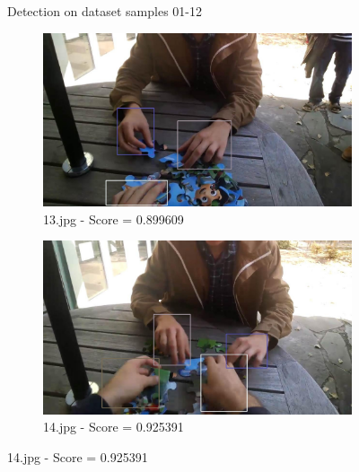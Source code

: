 \begin{figure}[!h]
\begin{subfigure}[b]{0.3\textwidth}
    \end{subfigure}
    \caption{Detection on dataset samples 01-12}
       
\end{figure}



\begin{figure}[!h]
    \centering
    \begin{subfigure}[b]{0.3 \textwidth}
        \centering
        \includegraphics[width=\textwidth]{images/handDetection/13.jpg}
        \caption{13.jpg - Score = 0.899609}
        
    \end{subfigure}
    \hfill
    \begin{subfigure}[b]{0.3\textwidth}
        \centering
        \includegraphics[width=\textwidth]{images/handDetection/14.jpg}
        \caption{14.jpg - Score = 0.925391}
        

\end{subfigure}
\end{figure}
